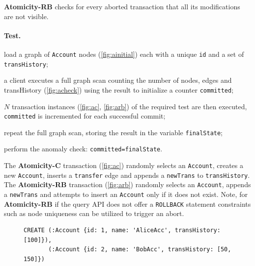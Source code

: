 {\flushleft \textbf{Atomicity-RB}} checks for every aborted transaction that all
its modifications are not visible.

\paragraph{Test.}
\begin{enumerate*}[label={(\roman*)}]
  \item load a graph of \texttt{Account} nodes (\autoref{fig:ainitial}) each 
        with a unique \texttt{id} and a set of \texttt{transHistory};
  \item a client executes a full graph scan counting the number of nodes, edges
        and transHistory (\autoref{fig:acheck}) using the result to initialize a
        counter \texttt{committed};
  \item $N$ transaction instances (\autoref{fig:ac}, \autoref{fig:arb}) of the
        required test are then executed, \texttt{committed} is incremented for
        each successful commit;
  \item repeat the full graph scan, storing the result in the variable
        \texttt{finalState};
  \item perform the anomaly check: \texttt{committed=finalState}.
\end{enumerate*}

The \textbf{Atomicity-C} transaction (\autoref{fig:ac}) randomly selects an
\texttt{Account}, creates a new \texttt{Account}, inserts a \texttt{transfer} 
edge and appends a \texttt{newTrans} to \texttt{transHistory}. The \textbf{Atomicity-RB} 
transaction (\autoref{fig:arb}) randomly selects an \texttt{Account}, appends a 
\texttt{newTrans} and attempts to insert an \texttt{Account} only if it does
not exist. Note, for \textbf{Atomicity-RB} if the query API does not offer a
\texttt{ROLLBACK} statement constraints such as node uniqueness can be utilized
to trigger an abort.

\begin{figure}[htb]
\centering

\begin{lstlisting}[language=cypher,label=fig:ainitial,caption=Cypher query for creating initial data for the \tx{Atomicity} transactions.]
CREATE (:Account {id: 1, name: 'AliceAcc', transHistory: [100]}),
       (:Account {id: 2, name: 'BobAcc', transHistory: [50, 150]})
\end{lstlisting}

\end{figure}

